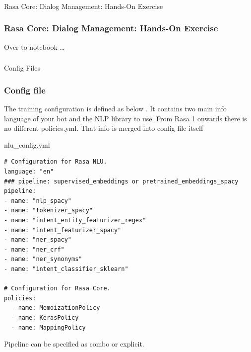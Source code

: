 \begin{frame}[fragile]\frametitle{}
\begin{center}

{\Large Rasa Core: Dialog Management: Hands-On Exercise}

\end{center}
\end{frame}

\begin{frame}[fragile]\frametitle{Rasa Core: Dialog Management: Hands-On Exercise}
\begin{center}

{\Large Over to notebook \ldots}

\end{center}
\end{frame}



\begin{frame}[fragile]\frametitle{}
\begin{center}
{\Large Config Files}

\end{center}
\end{frame}

 \begin{frame}[fragile]\frametitle{Config file}
 
 The training configuration is defined as below . It contains two main info language of your bot and the NLP library to use.
 From Rasa 1 onwards there is no different policies.yml. That info is merged into config file itself
 
nlu\_config.yml


\begin{lstlisting}
# Configuration for Rasa NLU.
language: "en"
### pipeline: supervised_embeddings or pretrained_embeddings_spacy
pipeline:
- name: "nlp_spacy"
- name: "tokenizer_spacy"
- name: "intent_entity_featurizer_regex"
- name: "intent_featurizer_spacy"
- name: "ner_spacy"
- name: "ner_crf"
- name: "ner_synonyms"
- name: "intent_classifier_sklearn"

# Configuration for Rasa Core.
policies:
  - name: MemoizationPolicy
  - name: KerasPolicy
  - name: MappingPolicy
\end{lstlisting}

Pipeline can be specified as combo or explicit.
\end{frame}

